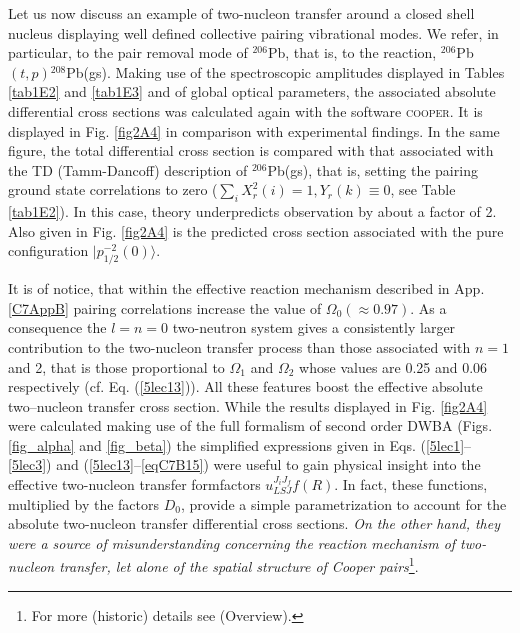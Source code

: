 Let us now discuss an example of two-nucleon transfer around a closed shell nucleus displaying well defined collective pairing vibrational modes. We refer, in particular, to the pair removal mode of $^{206}$Pb, that is, to the reaction, $^{206}$Pb$(t,p)$$^{208}$Pb(gs). Making use of the spectroscopic amplitudes displayed in Tables \ref{tab1E2} and \ref{tab1E3} and of global optical parameters, the associated  absolute differential cross sections was calculated again with the software \textsc{cooper}. It is displayed in Fig. \ref{fig2A4} in comparison with experimental findings. In  the same figure, the total differential cross section is compared with that associated with the TD (Tamm-Dancoff) description of $^{206}$Pb(gs), that is, setting the pairing ground state correlations to zero ($\sum_i X^2_r(i)=1, Y_r(k)\equiv 0$, see Table \ref{tab1E2}). In this case, theory underpredicts observation by about a factor of 2.  Also given in Fig. \ref{fig2A4} is the predicted cross section associated with the pure configuration $|p_{1/2}^{-2}(0)\rangle$. 


It is of notice, that within the effective reaction mechanism described in App. \ref{C7AppB} pairing correlations increase the value of $\Omega_0(\approx 0.97)$. As a consequence the   $l=n=0$ two-neutron system gives a consistently larger contribution to the two-nucleon transfer process than those associated with $n=1$ and 2, that is those proportional to $\Omega_1$ and $\Omega_2$ whose values are 0.25 and 0.06 respectively (cf. Eq. (\ref{5lec13})). All these features boost the effective absolute two--nucleon  transfer cross section. While the results displayed in Fig. \ref{fig2A4} were calculated making use of the full formalism of second order DWBA (Figs. \ref{fig_alpha} and \ref{fig_beta}) the simplified expressions given in Eqs. (\ref{5lec1}--\ref{5lec3}) and (\ref{5lec13}--\ref{eqC7B15}) were useful to gain physical insight into the effective  two-nucleon transfer formfactors $u^{J_iJ_f}_{LSJ}f(R)$. In fact, these functions, multiplied by the factors $D_0$, provide a simple parametrization to account for the absolute two-nucleon transfer  differential cross sections. \emph{On the other hand, they were a source of misunderstanding concerning the reaction mechanism of two-nucleon transfer, let alone of the spatial structure of Cooper pairs}\footnote{For more (historic) details see \cite{Bohr:19} (Overview).}.


